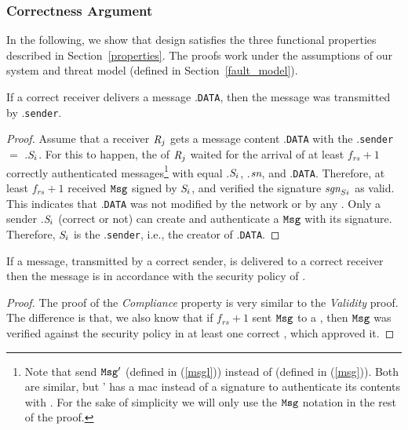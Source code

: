\subsubsection{Correctness Argument}
In the following, we show that \sieveq design satisfies the three functional properties described in Section~\ref{properties}.
The proofs work under the assumptions of our system and threat model (defined in Section~\ref{fault_model}).

\begin{validity}

If a correct receiver delivers a message \msg.\texttt{DATA}, then the message was transmitted by \msg.\texttt{sender}.
\end{validity}

\begin{proof}
Assume that a receiver $\emph{R}_j$ gets a message content \msg.\texttt{DATA} with the \msg.\texttt{sender} $=$ \msg.\texttt{$\emph{S}_i$}.
For this to happen, the \postsieve of $\emph{R}_j$ waited for the arrival of at least $f_{rs}+1$ correctly authenticated messages\footnote{Note that \repsieves send $\texttt{Msg}'$ (defined in (\ref{msgl}))  instead of \msg (defined in (\ref{msg})). Both are similar, but \msg' has a \gls{mac} instead of a signature to authenticate its contents with \postsieve. For the sake of simplicity we will only use the $\texttt{Msg}$ notation in the rest of the proof.} with equal \msg.\texttt{$\emph{S}_i$}, \msg.$\emph{sn}$, and \msg.\texttt{DATA}.
Therefore, at least $f_{rs}+1$ \repsieves received $\texttt{Msg}$ signed by $\emph{S}_i$, and verified the signature $\emph{sgn}_{Si}$ as valid.
This indicates that \msg.\texttt{DATA} was not modified by the network or by any \presieve.
Only a sender \msg.\texttt{$\emph{S}_i$} (correct or not) can create and authenticate a $\texttt{Msg}$ with its signature.
Therefore, $\emph{S}_i$ is the \msg.\texttt{sender}, i.e., the creator of \msg.\texttt{DATA}.
\end{proof}


\begin{security}
If a message, transmitted by a correct sender, is delivered to a correct receiver then the message is in accordance with the security policy of \sieveq.
\end{security}


\begin{proof}
The proof of the \emph{Compliance} property is very similar to the \emph{Validity} proof.
The difference is that, we also know that if $f_{rs}+1$ \repsieves sent $\texttt{Msg}$ to a \postsieve, then $\texttt{Msg}$ was verified against the security policy in at least one correct \repsieve, which approved it.
\end{proof}



